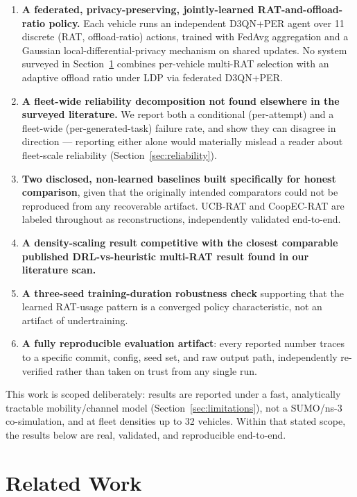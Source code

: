 \documentclass[10pt,twocolumn]{article}
\begin{document}
\begin{enumerate}
\item \textbf{A federated, privacy-preserving, jointly-learned RAT-and-offload-ratio policy.} Each
vehicle runs an independent D3QN+PER agent over 11 discrete (RAT, offload-ratio) actions, trained
with FedAvg aggregation and a Gaussian local-differential-privacy mechanism on shared updates. No
system surveyed in Section~\ref{sec:related} combines per-vehicle multi-RAT selection with an
adaptive offload ratio under LDP via federated D3QN+PER.
\item \textbf{A fleet-wide reliability decomposition not found elsewhere in the surveyed
literature.} We report both a conditional (per-attempt) and a fleet-wide (per-generated-task)
failure rate, and show they can disagree in direction --- reporting either alone would materially
mislead a reader about fleet-scale reliability (Section~\ref{sec:reliability}).
\item \textbf{Two disclosed, non-learned baselines built specifically for honest comparison}, given
that the originally intended comparators could not be reproduced from any recoverable artifact.
UCB-RAT and CoopEC-RAT are labeled throughout as reconstructions, independently validated
end-to-end.
\item \textbf{A density-scaling result competitive with the closest comparable published
DRL-vs-heuristic multi-RAT result found in our literature scan.}
\item \textbf{A three-seed training-duration robustness check} supporting that the learned
RAT-usage pattern is a converged policy characteristic, not an artifact of undertraining.
\item \textbf{A fully reproducible evaluation artifact}: every reported number traces to a specific
commit, config, seed set, and raw output path, independently re-verified rather than taken on trust
from any single run.
\end{enumerate}

This work is scoped deliberately: results are reported under a fast, analytically tractable
mobility/channel model (Section~\ref{sec:limitations}), not a SUMO/ns-3 co-simulation, and at fleet
densities up to 32 vehicles. Within that stated scope, the results below are real, validated, and
reproducible end-to-end.

\section{Related Work}
\label{sec:related}
\end{document}
